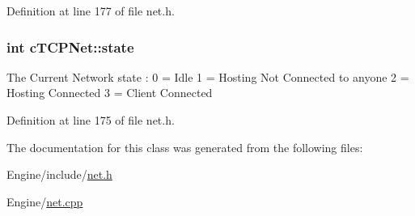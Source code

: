 Definition at line 177 of file net.\-h.

\hypertarget{classc_t_c_p_net_a07e6aa8d2af28f80aeefcce1b7c416c3}{
\subsubsection[{state}]{\setlength{\rightskip}{0pt plus 5cm}int c\-T\-C\-P\-Net\-::state}}\label{classc_t_c_p_net_a07e6aa8d2af28f80aeefcce1b7c416c3}
The Current Network state \-: 0 = Idle 1 = Hosting Not Connected to anyone 2 = Hosting Connected 3 = Client Connected 

Definition at line 175 of file net.\-h.



The documentation for this class was generated from the following files\-:\begin{DoxyCompactItemize}
\item 
Engine/include/\hyperlink{net_8h}{net.\-h}\item 
Engine/\hyperlink{net_8cpp}{net.\-cpp}\end{DoxyCompactItemize}
